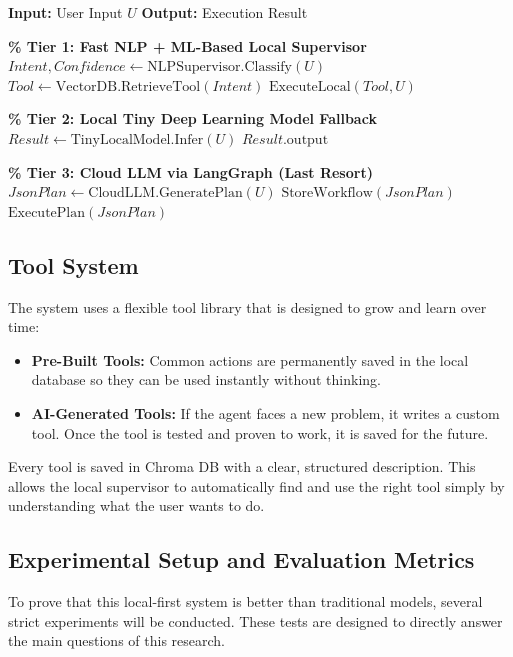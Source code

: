 \begin{algorithm}[H]
\caption{Multi-Tier Triage and Routing Logic}
\label{algo:multi_tier_routing}
\begin{algorithmic}[1]
    \State \textbf{Input:} User Input $U$
    \State \textbf{Output:} Execution Result
    
    \Statex \textbf{\% Tier 1: Fast NLP + ML-Based Local Supervisor}
    \State $Intent, Confidence \gets \text{NLPSupervisor.Classify}(U)$
        \State $Tool \gets \text{VectorDB.RetrieveTool}(Intent)$
            \State \Return $\text{ExecuteLocal}(Tool, U)$
        \EndIf
    \EndIf
    
    \Statex \textbf{\% Tier 2: Local Tiny Deep Learning Model Fallback}
    \State $Result \gets \text{TinyLocalModel.Infer}(U)$
        \State \Return $Result.\text{output}$
    \EndIf
    
    \Statex \textbf{\% Tier 3: Cloud LLM via LangGraph (Last Resort)}
    \State $JsonPlan \gets \text{CloudLLM.GeneratePlan}(U)$
    \State $\text{StoreWorkflow}(JsonPlan)$ 
    \State \Return $\text{ExecutePlan}(JsonPlan)$
\end{algorithmic}
\end{algorithm}

\subsection{Tool System}
The system uses a flexible tool library that is designed to grow and learn over time:
\begin{itemize}
    \item \textbf{Pre-Built Tools:} Common actions are permanently saved in the local database so they can be used instantly without thinking.
    \item \textbf{AI-Generated Tools:} If the agent faces a new problem, it writes a custom tool. Once the tool is tested and proven to work, it is saved for the future.
\end{itemize}
Every tool is saved in Chroma DB with a clear, structured description. This allows the local supervisor to automatically find and use the right tool simply by understanding what the user wants to do.\\

\subsection{Experimental Setup and Evaluation Metrics}
To prove that this local-first system is better than traditional models, several strict experiments will be conducted. These tests are designed to directly answer the main questions of this research.\\

